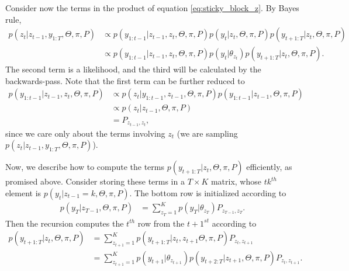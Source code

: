 \documentclass[14pt]{extreport}
\begin{document}
Consider now the terms in the product of equation \ref{eq:sticky_block_z}. By
Bayes rule,
\begin{align*}
  p\left(z_{t} \vert z_{t - 1}, y_{1:T}, \Theta, \pi, P\right) &\propto p\left(y_{1:t - 1} \vert z_{t - 1}, z_{t}, \Theta, \pi, P\right)
  p\left(y_{t} \vert z_{t}, \Theta, \pi, P\right)
  p\left(y_{t + 1 : T} \vert z_{t}, \Theta, \pi, P\right) \\
  &\propto p\left(y_{1:t - 1} \vert z_{t - 1}, z_t, \Theta, \pi, P\right) p\left(y_t \vert \theta_{z_t}\right) p\left(y_{t + 1 : T}\vert z_{t}, \Theta, \pi, P\right).
\end{align*}
The second term is a likelihood, and the third will be calculated by the
backwards-pass. Note that the first term can be further reduced to
\begin{align*}
  p\left(y_{1:t - 1} \vert z_{t - 1}, z_t, \Theta, \pi, P\right) &\propto p\left(z_{t} \vert y_{1:t - 1}, z_{t - 1}, \Theta, \pi, P\right)p\left(y_{1:t - 1} \vert z_{t - 1}, \Theta, \pi, P\right) \\
  &\propto p\left(z_{t} \vert z_{t - 1}, \Theta, \pi, P\right) \\
  &= P_{z_{t - 1}, z_{t}},
\end{align*}
since we care only about the terms involving $z_{t}$ (we are sampling
$p\left(z_{t} \vert z_{t - 1}, y_{1:T}, \Theta, \pi, P\right)$).

Now, we describe how to compute the terms $p\left(y_{t + 1:T} \vert z_t, \Theta,
\pi, P\right)$ efficiently, as promised above. Consider storing these terms in a
$T \times K$ matrix, whose $tk^{th}$ element is $p\left(y_{t} \vert z_{t - 1} =
k, \Theta, \pi, P\right)$. The bottom row is initialized according to
\begin{align*}
 p\left(y_T \vert z_{T - 1}, \Theta, \pi, P\right)  &= \sum_{z_{T} = 1}^{K} p\left(y_{T} \vert \theta_{z_{T}}\right) P_{z_{T - 1}, z_{T}}.
\end{align*}
Then the recursion computes the $t^{th}$ row from the $t + 1^{st}$ according to
\begin{align*}
  p\left(y_{t + 1:T} \vert z_t, \Theta, \pi, P\right) &= \sum_{z_{t + 1} = 1}^{K} p\left(y_{t + 1 : T} \vert z_{t}, z_{t + 1} \Theta, \pi, P\right) P_{z_{t}, z_{t + 1}} \\
  &= \sum_{z_{t + 1} = 1}^{K} p\left(y_{t + 1} \vert \theta_{z_{t + 1}}\right) p\left(y_{t + 2 : T} \vert z_{t + 1}, \Theta, \pi, P\right) P_{z_{t}, z_{t + 1}}.
\end{align*}
\end{document}
